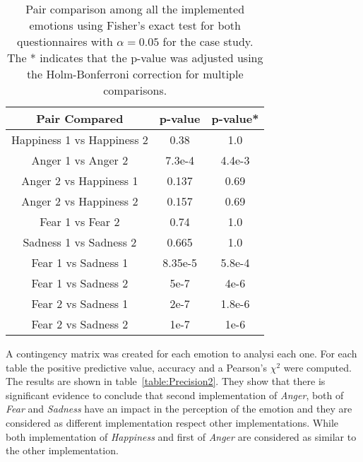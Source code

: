 \begin{table}[h]
\centering
\small
\caption{Pair comparison among all the implemented emotions using Fisher's exact test for both questionnaires with $\alpha = 0.05$ for the  case study. The * indicates that the p-value was adjusted using the Holm-Bonferroni correction for multiple comparisons.}
		\label{table:result_compare_fourth}
		\begin{tabular}{|c|c|c|}
			\hline	
\textbf{Pair Compared} & \textbf{p-value} & \textbf{p-value*}\\	
			\hline
			Happiness 1 vs Happiness 2 &0.38&1.0\\
			\hline
			Anger 1 vs Anger 2 & 7.3e-4&4.4e-3\\
			\hline
			Anger 2 vs Happiness 1 & 0.137&0.69\\
			\hline
			Anger 2 vs Happiness 2 & 0.157&0.69\\
			\hline
			Fear 1 vs Fear 2 & 0.74&1.0\\
			\hline
			Sadness 1 vs Sadness 2 & 0.665&1.0\\
			\hline
			Fear 1 vs Sadness 1& 8.35e-5&5.8e-4\\
			\hline
			Fear 1 vs Sadness 2 & 5e-7&4e-6\\
			\hline
			Fear 2 vs Sadness 1 & 2e-7&1.8e-6\\
			\hline
			Fear 2 vs Sadness 2 & 1e-7&1e-6\\
			\hline
			\end{tabular}
\end{table} 

A contingency matrix was created for each emotion to analysi each one. For each table the positive predictive value, accuracy and a Pearson's $\chi^2$ were computed. The results are shown in table~\ref{table:Precision2}. They show that there is significant evidence to conclude that second implementation of \textit{Anger}, both of \textit{Fear} and \textit{Sadness} have an impact in the perception of the emotion and they are considered as different implementation respect other implementations. While both implementation of \textit{Happiness} and first of \textit{Anger} are considered as similar to the other implementation.

